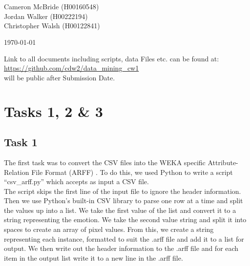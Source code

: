 \documentclass[12pt]{article}
\def \projectTitle {F20DL Data Mining \& Machine Learning}
\def \projectSubtitle {Coursework 1}
\def \authorOne {Cameron McBride}
\def \authorOneID {H00160548}
\def \authorTwo{Jordan Walker}
\def \authorTwoID {H00222194}
\def \authorThree{Christopher Walsh}
\def \authorThreeID {H00122841}
\begin{document}
\begin{titlepage}
\begin{center}
		\vspace*{3cm}
		{\Huge \color{blue}{\projectTitle}}\\[4mm]
		{\huge \color{grey}{\projectSubtitle}}\\[2cm]
		
		{\Large {\authorOne} ({\authorOneID})}\\[4mm]
		{\Large {\authorTwo} ({\authorTwoID})}\\[4mm]
		{\Large {\authorThree} ({\authorThreeID})}\\[4mm]
		
		\vspace{6cm}
		
		{\large \color{grey}{Date:}}
		{\large \today}
		
		\vspace{2cm}
		
		Link to all documents including scripts, data Files etc. can be found at: 
		\href{https://github.com/cdw2/data_mining_cw1}{https://github.com/cdw2/data\_mining\_cw1}\\
		
		{\color{grey} \footnotesize *will be public after Submission Date. }
		
		\vspace{3cm}
\end{center}
\end{titlepage}

\section{Tasks 1, 2 \& 3}

\subsection{Task 1}


The first task was to convert the CSV files into the WEKA specific Attribute-Relation File Format (ARFF) \cite{wakito2008}. To do this, we used Python to write a script ``csv\_arff.py'' which accepts as input a CSV file.\\

The script skips the first line of the input file to ignore the header information. Then we use Python's built-in CSV library to parse one row at a time and split the values up into a list. We take the first value of the list and convert it to a string representing the emotion. We take the second value string and split it into spaces to create an array of pixel values. From this, we create a string representing each instance, formatted to suit the .arff file and add it to a list for output. We then write out the header information to the .arff file and for each item in the output list write it to a new line in the .arff file.
\end{document}
